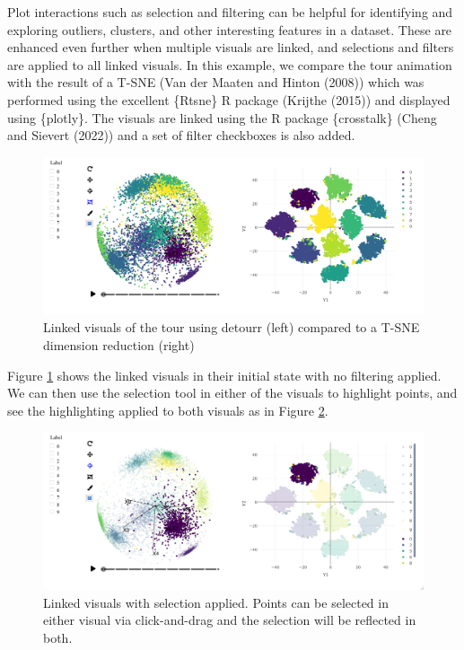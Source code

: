Plot interactions such as selection and filtering can be helpful for identifying and exploring outliers, clusters, and other interesting features in a dataset. These are enhanced even further when multiple visuals are linked, and selections and filters are applied to all linked visuals. In this example, we compare the tour animation with the result of a T-SNE (Van der Maaten and Hinton (2008)) which was performed using the excellent \{Rtsne\} R package (Krijthe (2015)) and displayed using \{plotly\}. The visuals are linked using the R package \{crosstalk\} (Cheng and Sievert (2022)) and a set of filter checkboxes is also added.

\begin{figure}
\includegraphics[width=\textwidth]{figures/mnist/case-study-linked-brushing-full} \caption{Linked visuals of the tour using {detourr} (left) compared to a T-SNE dimension reduction (right)}\label{fig:linked-tsne-full}
\end{figure}

Figure \ref{fig:linked-tsne-full} shows the linked visuals in their initial state with no filtering applied. We can then use the selection tool in either of the visuals to highlight points, and see the highlighting applied to both visuals as in Figure \ref{fig:linked-tsne-selection}.

\begin{figure}
\includegraphics[width=\textwidth]{figures/mnist/case-study-linked-brushing-selection} \caption{Linked visuals with selection applied. Points can be selected in either visual via click-and-drag and the selection will be reflected in both.}\label{fig:linked-tsne-selection}
\end{figure}

